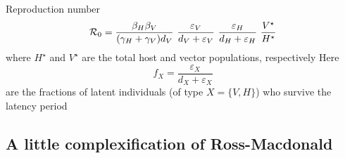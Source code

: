 \documentclass[aspectratio=169]{beamer}\usepackage[]{graphicx}\usepackage[]{xcolor}
\begin{document}
\begin{frame}{Reproduction number}
\begin{equation}\label{eq:vector_host_2}
\mathcal{R}_0 =
\frac{\beta_H\beta_V}{(\gamma_H+\gamma_V)d_V}\
\frac{\varepsilon_V}{d_V+\varepsilon_V}\
\frac{\varepsilon_H}{d_H+\varepsilon_H}\
\frac{V^\star}{H^\star}
\end{equation}
where $H^\star$ and $V^\star$ are the total host and vector populations, respectively
\vfill
Here
\[
f_X = \frac{\varepsilon_X}{d_X+\varepsilon_X}
\]
are the fractions of latent individuals (of type $X=\{V,H\}$) who survive the latency period
\end{frame}


\subsection{A little complexification of Ross-Macdonald}
\end{document}
